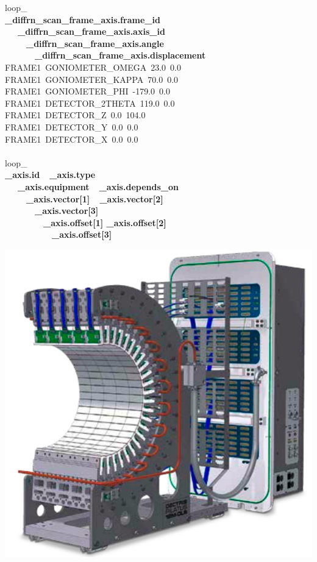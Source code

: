 \documentclass[11pt]{a0poster}
\begin{document}
\begin{minipage}[]{0.29\linewidth}
\begin{minipage}[]{0.525\linewidth}
loop\_\\
{\bf \_diffrn\_scan\_frame\_axis.frame\_id}\\
\-\ ~~{\bf \_diffrn\_scan\_frame\_axis.axis\_id}\\
\-\ ~~~~{\bf \_diffrn\_scan\_frame\_axis.angle}\\
\-\ ~~~~~~{\bf \_diffrn\_scan\_frame\_axis.displacement}\\
FRAME1~GONIOMETER\_OMEGA~23.0~0.0\\
FRAME1~GONIOMETER\_KAPPA~70.0~0.0\\
FRAME1~GONIOMETER\_PHI~-\nobreak{}179.0~0.0\\
FRAME1~DETECTOR\_2THETA~119.0~0.0\\
FRAME1~DETECTOR\_Z~0.0~104.0\\
FRAME1~DETECTOR\_Y~0.0~0.0\\
FRAME1~DETECTOR\_X~0.0~0.0\\
\\
loop\_\\
{\bf \_axis.id~~\_axis.type} \\
\-\ ~~{\bf \_axis.equipment~~\_axis.depends\_on}\\
\-\ ~~~~{\bf \_axis.vector[1]~~\_axis.vector[2]}\\
\-\ ~~~~~~{\bf \_axis.vector[3]}\\
\-\ ~~~~~~~~{\bf \_axis.offset[1]  \_axis.offset[2]}\\
\-\ ~~~~~~~~~~{\bf   \_axis.offset[3]}\\
\end{minipage}\hfill\begin{minipage}[]{0.475\linewidth}
\vspace{-10mm}
\hspace{-40mm}\includegraphics[width=7.5in]{I23}\\

\end{minipage}
\end{minipage}
\end{document}
